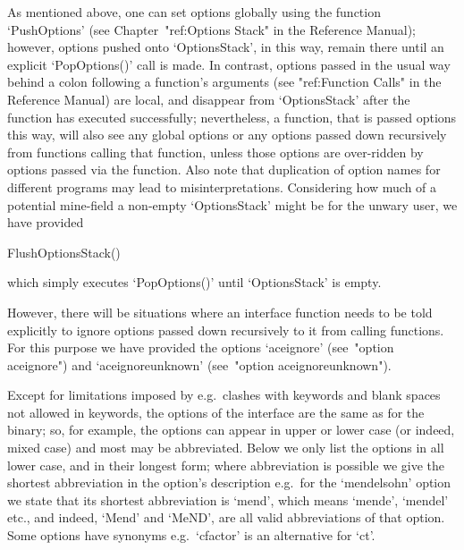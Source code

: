 As mentioned above, one can set options globally  using  the  function
`PushOptions' (see Chapter~"ref:Options Stack" in the {\GAP} Reference
Manual); however, options pushed onto  `OptionsStack',  in  this  way,
remain there  until  an  explicit  `PopOptions()'  call  is  made.  In
contrast, options passed in the usual way behind a colon  following  a
function's arguments (see "ref:Function Calls" in the {\GAP} Reference
Manual)  are  local,  and  disappear  from  `OptionsStack'  after  the
function has executed successfully; nevertheless, a function, that  is
passed options this way, will also  see  any  global  options  or  any
options passed down recursively from functions calling that  function,
unless those  options  are  over-ridden  by  options  passed  via  the
function. Also note that duplication of  option  names  for  different
programs may lead to misinterpretations. Considering  how  much  of  a
potential mine-field a  non-empty  `OptionsStack'  might  be  for  the
unwary user, we have provided

\>FlushOptionsStack()

which simply executes `PopOptions()' until `OptionsStack' is empty.

However, there will be situations where an {\ACE}  interface  function
needs to be told explicitly to ignore options passed down  recursively
to it from calling functions. For this purpose we  have  provided  the
options `aceignore' (see~"option  aceignore")  and  `aceignoreunknown'
(see~"option aceignoreunknown").

\enditems


Except for limitations imposed by {\GAP}  e.g.\  clashes  with  {\GAP}
keywords and blank spaces not allowed in keywords, the options of  the
{\ACE} interface are the same as for the binary; so, for example,  the
options can appear in upper or lower case (or indeed, mixed case)  and
most may be abbreviated. Below we only list the options in  all  lower
case, and in their longest form; where  abbreviation  is  possible  we
give the shortest abbreviation in the  option's  description  e.g.~for
the `mendelsohn' option we state that  its  shortest  abbreviation  is
`mend', which means `mende', `mendel' etc.,  and  indeed,  `Mend'  and
`MeND', are all valid abbreviations of that option. Some options  have
synonyms e.g.~`cfactor' is an alternative for `ct'.

